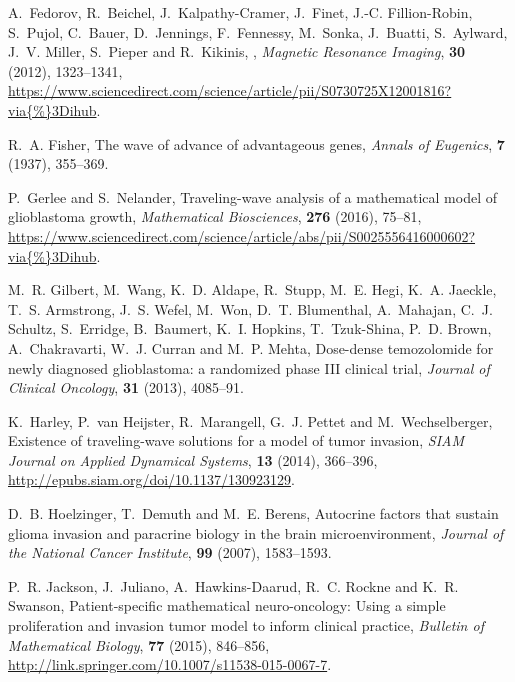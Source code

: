 \documentclass{aims}
\numberwithin{equation}{section}
\begin{document}
\begin{thebibliography}{10}
\newblock A.~Fedorov, R.~Beichel, J.~Kalpathy-Cramer, J.~Finet, J.-C.
  Fillion-Robin, S.~Pujol, C.~Bauer, D.~Jennings, F.~Fennessy, M.~Sonka,
  J.~Buatti, S.~Aylward, J.~V. Miller, S.~Pieper and R.~Kikinis,
,
\newblock \emph{Magnetic Resonance Imaging}, \textbf{30} (2012), 1323--1341,
\newblock
  \urlprefix\url{https://www.sciencedirect.com/science/article/pii/S0730725X12001816?via{\%}3Dihub}.

\newblock R.~A. Fisher,
\newblock The wave of advance of advantageous genes,
\newblock \emph{Annals of Eugenics}, \textbf{7} (1937), 355--369.

\newblock P.~Gerlee and S.~Nelander,
\newblock Traveling-wave analysis of a mathematical model of glioblastoma
  growth,
\newblock \emph{Mathematical Biosciences}, \textbf{276} (2016), 75--81,
\newblock
  \urlprefix\url{https://www.sciencedirect.com/science/article/abs/pii/S0025556416000602?via{\%}3Dihub}.

\newblock M.~R. Gilbert, M.~Wang, K.~D. Aldape, R.~Stupp, M.~E. Hegi, K.~A.
  Jaeckle, T.~S. Armstrong, J.~S. Wefel, M.~Won, D.~T. Blumenthal, A.~Mahajan,
  C.~J. Schultz, S.~Erridge, B.~Baumert, K.~I. Hopkins, T.~Tzuk-Shina, P.~D.
  Brown, A.~Chakravarti, W.~J. Curran and M.~P. Mehta,
\newblock Dose-dense temozolomide for newly diagnosed glioblastoma: a
  randomized phase {III} clinical trial,
\newblock \emph{Journal of Clinical Oncology}, \textbf{31} (2013), 4085--91.

\newblock K.~Harley, P.~van Heijster, R.~Marangell, G.~J. Pettet and
  M.~Wechselberger,
\newblock Existence of traveling-wave solutions for a model of tumor invasion,
\newblock \emph{SIAM Journal on Applied Dynamical Systems}, \textbf{13} (2014),
  366--396,
\newblock \urlprefix\url{http://epubs.siam.org/doi/10.1137/130923129}.

\newblock D.~B. Hoelzinger, T.~Demuth and M.~E. Berens,
\newblock Autocrine factors that sustain glioma invasion and paracrine biology
  in the brain microenvironment,
\newblock \emph{Journal of the National Cancer Institute}, \textbf{99} (2007),
  1583--1593.

\newblock P.~R. Jackson, J.~Juliano, A.~Hawkins-Daarud, R.~C. Rockne and K.~R.
  Swanson,
\newblock Patient-specific mathematical neuro-oncology: Using a simple
  proliferation and invasion tumor model to inform clinical practice,
\newblock \emph{Bulletin of Mathematical Biology}, \textbf{77} (2015),
  846--856,
\newblock \urlprefix\url{http://link.springer.com/10.1007/s11538-015-0067-7}.


\end{thebibliography}
\end{document}
